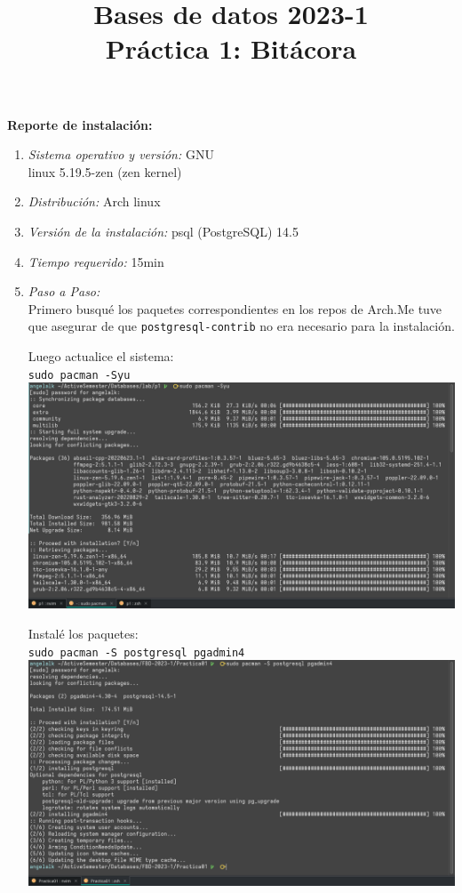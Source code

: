 \documentclass[12pt,a4paper]{article}
\title{Bases de datos 2023-1\\
Práctica 1: Bitácora}
\begin{document}
\maketitle

\textbf{Reporte de instalación:}\\
\begin{enumerate}
	\item \textit{Sistema operativo y versión:} GNU\\linux 5.19.5-zen (zen kernel)\\

	\item \textit{Distribución:} Arch linux\\

	\item \textit{Versión de la instalación:} psql (PostgreSQL) 14.5\\

	\item \textit{Tiempo requerido:} 15min\\

	\item \textit{Paso a Paso:}\\
		Primero busqué los paquetes correspondientes en los repos de
		Arch.Me tuve que asegurar de que \texttt{postgresql-contrib}
		no era necesario para la instalación.

		Luego actualice el sistema:\\
		\texttt{sudo pacman -Syu}\\
		\includegraphics[scale=0.3]{assets/01-angel.png}

		Instalé los paquetes:\\
		\texttt{sudo pacman -S postgresql pgadmin4}\\
		\includegraphics[scale=0.3]{assets/02-angel.png}


\end{enumerate}
\end{document}
